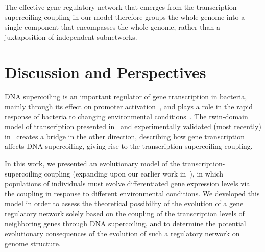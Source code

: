 The effective gene regulatory network that emerges from the transcription-supercoiling coupling in our model therefore groups the whole genome into a single component that encompasses the whole genome, rather than a juxtaposition of independent subnetworks.

\section{Discussion and Perspectives}


DNA supercoiling is an important regulator of gene transcription in bacteria, mainly through its effect on promoter activation~\citep{forquet2021}, and plays a role in the rapid response of bacteria to changing environmental conditions~\citep{martisb.2019}.
The twin-domain model of transcription presented in~\cite{liu1987} and experimentally validated (most recently) in~\cite{visser2022} creates a bridge in the other direction, describing how gene transcription affects DNA supercoiling, giving rise to the transcription-supercoiling coupling.

In this work, we presented an evolutionary model of the transcription-supercoiling coupling (expanding upon our earlier work in~\cite{grohens2021}), in which populations of individuals must evolve differentiated gene expression levels via the coupling in response to different environmental conditions.
We developed this model in order to assess the theoretical possibility of the evolution of a gene regulatory network solely based on the coupling of the transcription levels of neighboring genes through DNA supercoiling, and to determine the potential evolutionary consequences of the evolution of such a regulatory network on genome structure.

